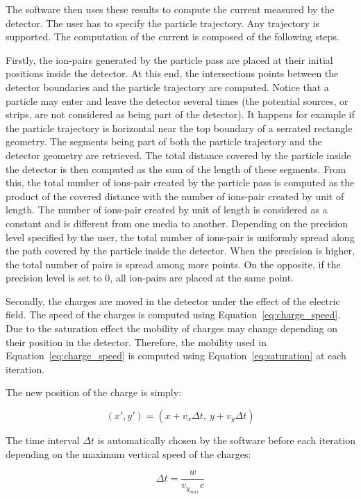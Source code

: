 \documentclass[11pt]{article}
\begin{document}
	The software then uses these results to compute the current measured by the
	detector. The user has to specify the particle trajectory. Any trajectory is
	supported. The computation of the current is composed of the following steps.

	Firstly, the ion-pairs generated by the particle pass are placed at their initial
	positions inside the detector. At this end, the intersections points between the
	detector boundaries and the particle
	trajectory are computed. Notice that a particle may enter and leave the detector
	several times (the potential sources, or strips, are not considered as being
	part of the detector). It happens for example if the particle trajectory is
	horizontal near the top boundary of a serrated rectangle geometry.
	The segments being part of both the particle trajectory and the detector
	geometry are retrieved. The total
	distance covered by the particle inside the detector is then computed as
	the sum of the length of these segments. From this, the total number of ions-pair
	created by the particle pass is computed
	as the product of the covered distance with the number of ions-pair created by unit
	of length. The number of ions-pair created by unit
	of length is considered as a constant and is different from one
	media to another. Depending on the precision level specified by the user, the
	total number of ions-pair
	is uniformly spread along the path covered by the particle inside the
	detector. When the precision is higher, the total number of pairs is spread
	among more points. On the opposite, if the precision level is set to 0,
	all ion-pairs are placed at the same point.


Secondly, the charges are moved in the detector under the effect of the electric
field. The speed of the charges is computed using Equation~\ref{eq:charge_speed}.
Due to the saturation effect the mobility of charges may change depending on
their position in the detector. Therefore, the mobility used in Equation~\ref{eq:charge_speed}
is computed using Equation~\ref{eq:saturation} at each iteration.



The new position of the charge is simply:

\[(x',y') = (x + v_x \Delta t, \ y + v_y \Delta t)\]

The time interval $\Delta t$ is automatically chosen by the software before
each iteration depending on the maximum vertical speed of the charges:

\[\Delta t = \frac{w}{v_{y_{max}} c}\]
\end{document}
